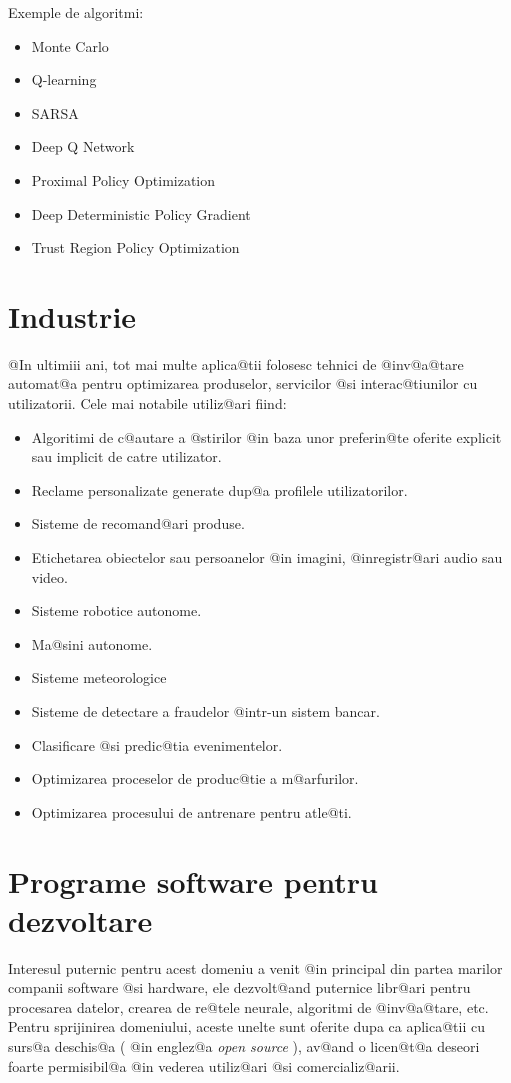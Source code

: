 Exemple de algoritmi:
\begin{itemize}
	\item Monte Carlo
	\item Q-learning
	\item SARSA
	\item Deep Q Network
	\item Proximal Policy Optimization
	\item Deep Deterministic Policy Gradient
	\item Trust Region Policy Optimization
\end{itemize}

\section{Industrie}

	@In ultimiii ani, tot mai multe aplica@tii folosesc tehnici de @inv@a@tare automat@a pentru optimizarea produselor, servicilor @si interac@tiunilor cu utilizatorii. Cele mai notabile utiliz@ari fiind:
\begin{itemize}
	\item Algoritimi de c@autare a @stirilor @in baza unor preferin@te oferite explicit sau implicit de catre utilizator.
	\item Reclame personalizate generate dup@a profilele utilizatorilor.
	\item Sisteme de recomand@ari produse.
	\item Etichetarea obiectelor sau persoanelor @in imagini, @inregistr@ari audio sau video.
	\item Sisteme robotice autonome.
	\item Ma@sini autonome.
	\item Sisteme meteorologice
	\item Sisteme de detectare a fraudelor @intr-un sistem bancar.
	\item Clasificare @si predic@tia evenimentelor. 
	\item Optimizarea proceselor de produc@tie a m@arfurilor.
	\item Optimizarea procesului de antrenare pentru atle@ti.
\end{itemize}

\section{Programe software pentru dezvoltare}

Interesul puternic pentru acest domeniu a venit @in principal din partea marilor companii software @si hardware, ele dezvolt@and puternice libr@ari pentru procesarea datelor, crearea de re@tele neurale, algoritmi de @inv@a@tare, etc. Pentru sprijinirea domeniului, aceste unelte sunt oferite dupa ca aplica@tii cu surs@a deschis@a ( @in englez@a {\sl open source} ), av@and o licen@t@a deseori foarte permisibil@a @in vederea utiliz@ari @si comercializ@arii.

